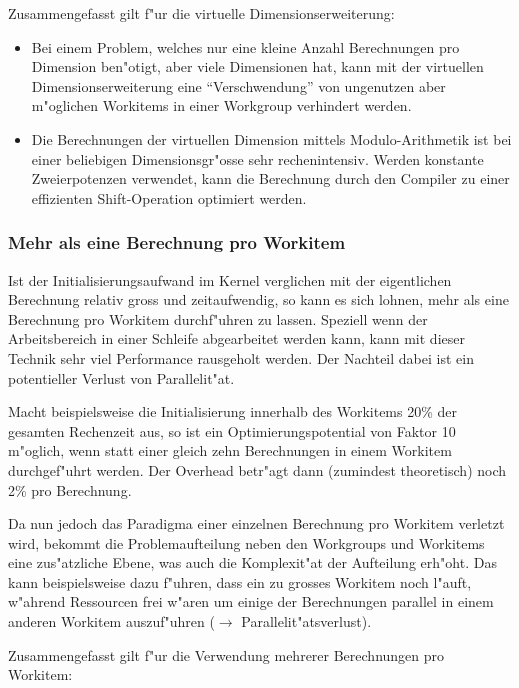 \begin{refsection}
Zusammengefasst gilt f"ur die virtuelle Dimensionserweiterung:

\begin{itemize}
 \item Bei einem Problem, welches nur eine kleine Anzahl Berechnungen pro 
       Dimension ben"otigt, aber viele Dimensionen hat, kann mit der
       virtuellen Dimensionserweiterung eine ``Verschwendung'' von
       ungenutzen aber m"oglichen Workitems in einer Workgroup verhindert 
       werden.
 \item Die Berechnungen der virtuellen Dimension mittels Modulo-Arithmetik 
       ist bei einer beliebigen Dimensionsgr"osse sehr rechenintensiv.
			 Werden konstante Zweierpotenzen verwendet, kann die Berechnung durch den
			 Compiler zu einer effizienten Shift-Operation optimiert werden.
\end{itemize}


\subsubsection{Mehr als eine Berechnung pro Workitem}

Ist der Initialisierungsaufwand im Kernel verglichen mit der eigentlichen
Berechnung relativ gross und zeitaufwendig, so kann es sich lohnen, mehr als
eine Berechnung pro Workitem durchf"uhren zu lassen. Speziell wenn der
Arbeitsbereich in einer Schleife abgearbeitet werden kann, kann mit
dieser Technik sehr viel Performance rausgeholt werden. Der Nachteil dabei ist
ein potentieller Verlust von Parallelit"at.

Macht beispielsweise die Initialisierung innerhalb des Workitems 20\% der
gesamten Rechenzeit aus, so ist ein Optimierungspotential von Faktor 10
m"oglich, wenn statt einer gleich zehn Berechnungen in einem Workitem
durchgef"uhrt werden. Der Overhead betr"agt dann (zumindest theoretisch) noch
2\% pro Berechnung. 

Da nun jedoch das Paradigma einer einzelnen Berechnung pro Workitem verletzt
wird, bekommt die Problemaufteilung neben den Workgroups und Workitems eine
zus"atzliche Ebene, was auch die Komplexit"at der Aufteilung erh"oht. Das kann
beispielsweise dazu f"uhren, dass ein zu grosses Workitem noch l"auft, w"ahrend
Ressourcen frei w"aren um einige der Berechnungen parallel in einem anderen
Workitem auszuf"uhren ($\rightarrow$ Parallelit"atsverlust).

Zusammengefasst gilt f"ur die Verwendung mehrerer Berechnungen pro Workitem:


\end{refsection}
